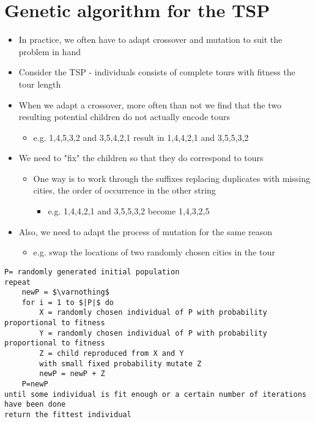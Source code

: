 \documentclass{article}[18pt]
\begin{document}
\section{Genetic algorithm for the TSP}
\begin{itemize}
	\item In practice, we often have to adapt crossover and mutation to suit the problem in hand
	\item Consider the TSP - individuals consists of complete tours with fitness the tour length
	\item When we adapt a crossover, more often than not we find that the two resulting potential children do not actually encode tours
	\begin{itemize}
		\item e.g. 1,4,5,3,2 and 3,5,4,2,1 result in 1,4,4,2,1 and 3,5,5,3,2
	\end{itemize}
	\item We need to "fix" the children so that they do correspond to tours
	\begin{itemize}
		\item One way is to work through the suffixes replacing duplicates with missing cities, the order of occurrence in the other string
		\begin{itemize}
			\item e.g. 1,4,4,2,1 and 3,5,5,3,2 become 1,4,3,2,5
		\end{itemize}
	\end{itemize}
	\item Also, we need to adapt the process of mutation for the same reason
	\begin{itemize}
		\item e.g. swap the locations of two randomly chosen cities in the tour
	\end{itemize}
\end{itemize}
\begin{lstlisting}[caption=Genetic-algorithm]
P= randomly generated initial population
repeat
	newP = $\varnothing$
	for i = 1 to $|P|$ do
		X = randomly chosen individual of P with probability proportional to fitness
		Y = randomly chosen individual of P with probability proportional to fitness
		Z = child reproduced from X and Y
		with small fixed probability mutate Z
		newP = newP + Z
	P=newP
until some individual is fit enough or a certain number of iterations have been done	
return the fittest individual 
\end{lstlisting}
\end{document}
